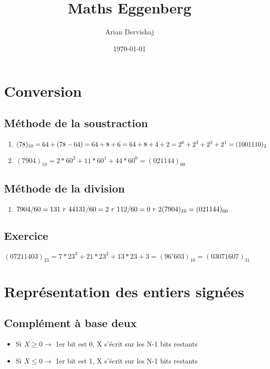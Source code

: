 \documentclass[12pt]{article}
\title{Maths Eggenberg}
\author{Arian Dervishaj}
\date{\today}
\begin{document}
\maketitle
\pagebreak

\section*{Conversion}
\subsection*{Méthode de la soustraction}

\begin{enumerate}
    \item   $(78)_{10}= 64 + (78-64) = 64 + 8 + 6 = 64 + 8 + 4 + 2 = \\
            2^{6} + 2^{3} + 2^{2} + 2^{1} = (1001110)_2$
    \item   $(7904)_{10} = 2 * 60^{2} + 11 * 60^{1} + 44 * 60^{0} = (021144)_{60}$
\end{enumerate}

\subsection*{Méthode de la division}

\begin{enumerate}
    \item   $7904 / 60 = 131\  r\ 44 \\
            131 / 60 = 2\ r\ 11 \\ 
            2 / 60 = 0\ r\ 2 \\ 
            (7904)_{10} = (021144)_{60}$
\end{enumerate}

\subsection*{Exercice}
    $(07211403)_{23} = 7 * 23^{3} + 21 * 23^{2} + 13*23 + 3 = (96'603)_{10} = (03071607)_{31}$


\section*{Représentation des entiers signées}
\subsection*{Complément à base deux}
\begin{itemize}
    \item Si $X \ge 0 \rightarrow$ 1er bit est 0, X s'écrit sur les N-1 bits restants
    \item Si $X \le 0 \rightarrow$ 1er bit est 1, X s'écrit sur les N-1 bits restants
\end{itemize}
\end{document}
